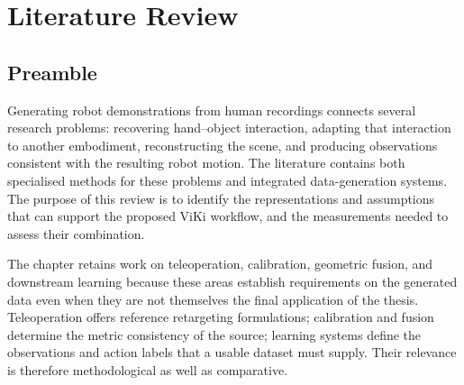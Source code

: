 
\chapter{Literature Review}
\label{ch:lit}

\section{Preamble}
\label{sec:lit-preamble}

Generating robot demonstrations from human recordings connects several
research problems: recovering hand--object interaction, adapting that interaction
to another embodiment, reconstructing the scene, and producing observations
consistent with the resulting robot motion. The literature contains both
specialised methods for these problems and integrated data-generation systems.
The purpose of this review is to identify the representations and assumptions
that can support the proposed ViKi workflow, and the measurements needed to
assess their combination.

The chapter retains work on teleoperation, calibration, geometric fusion, and
downstream learning because these areas establish requirements on the generated
data even when they are not themselves the final application of the thesis.
Teleoperation offers reference retargeting formulations; calibration and fusion
determine the metric consistency of the source; learning systems define the
observations and action labels that a usable dataset must supply. Their
relevance is therefore methodological as well as comparative.


